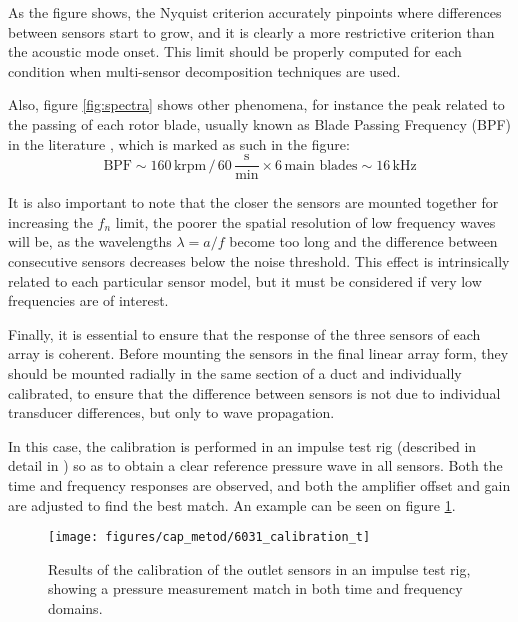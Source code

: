 As the figure shows, the Nyquist criterion accurately pinpoints where differences between sensors start to grow, and it is clearly a more restrictive criterion than the acoustic mode onset. This limit should be properly computed for each condition when multi-sensor decomposition techniques are used.

Also, figure \ref{fig:spectra} shows other phenomena, for instance the peak related to the passing of each rotor blade, usually known as Blade Passing Frequency (BPF) in the literature \cite{raitor2008sound}, which is marked as such in the figure:
\begin{equation}
  \text{BPF} \sim 160\,\text{krpm}\,/\,60\,\frac{\text{s}}{\text{min}} \times 6\,\text{main blades} \sim 16\,\text{kHz}
\end{equation}

It is also important to note that the closer the sensors are mounted together for increasing the $f_n$ limit, the poorer the spatial resolution of low frequency waves will be, as the wavelengths $\lambda=a/f$ become too long and the difference between consecutive sensors decreases below the noise threshold. This effect is intrinsically related to each particular sensor model, but it must be considered if very low frequencies are of interest.

Finally, it is essential to ensure that the response of the three sensors of each array is coherent. Before mounting the sensors in the final linear array form, they should be mounted radially in the same section of a duct and individually calibrated, to ensure that the difference between sensors is not due to individual transducer differences, but only to wave propagation.

In this case, the calibration is performed in an impulse test rig (described in detail in \cite{payri2000modified}) so as to obtain a clear reference pressure wave in all sensors. Both the time and frequency responses are observed, and both the amplifier offset and gain are adjusted to find the best match. An example can be seen on figure \ref{fig:6031_calibration}.

\begin{figure}[t!]
\centering
\texttt{[image: figures/cap\_metod/6031\_calibration\_t]}
\caption{Results of the calibration of the outlet sensors in an impulse test rig, showing a pressure measurement match in both time and frequency domains.}
\label{fig:6031_calibration}
\end{figure}

